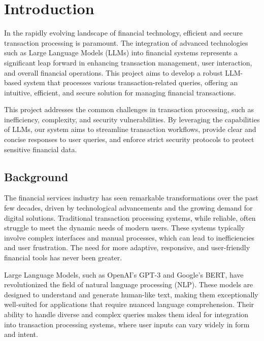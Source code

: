 \setcounter{equation}{0}

\chapter{Introduction}

\noindent In the rapidly evolving landscape of financial technology, efficient and secure transaction processing is paramount. The integration of advanced technologies such as Large Language Models (LLMs) into financial systems represents a significant leap forward in enhancing transaction management, user interaction, and overall financial operations. This project aims to develop a robust LLM-based system that processes various transaction-related queries, offering an intuitive, efficient, and secure solution for managing financial transactions.

\noindent This project addresses the common challenges in transaction processing, such as inefficiency, complexity, and security vulnerabilities. By leveraging the capabilities of LLMs, our system aims to streamline transaction workflows, provide clear and concise responses to user queries, and enforce strict security protocols to protect sensitive financial data.


\clearpage

\section{Background}

\noindent The financial services industry has seen remarkable transformations over the past few decades, driven by technological advancements and the growing demand for digital solutions. Traditional transaction processing systems, while reliable, often struggle to meet the dynamic needs of modern users. These systems typically involve complex interfaces and manual processes, which can lead to inefficiencies and user frustration. The need for more adaptive, responsive, and user-friendly financial tools has never been greater.

\noindent Large Language Models, such as OpenAI's GPT-3 and Google's BERT, have revolutionized the field of natural language processing (NLP). These models are designed to understand and generate human-like text, making them exceptionally well-suited for applications that require nuanced language comprehension. Their ability to handle diverse and complex queries makes them ideal for integration into transaction processing systems, where user inputs can vary widely in form and intent.

